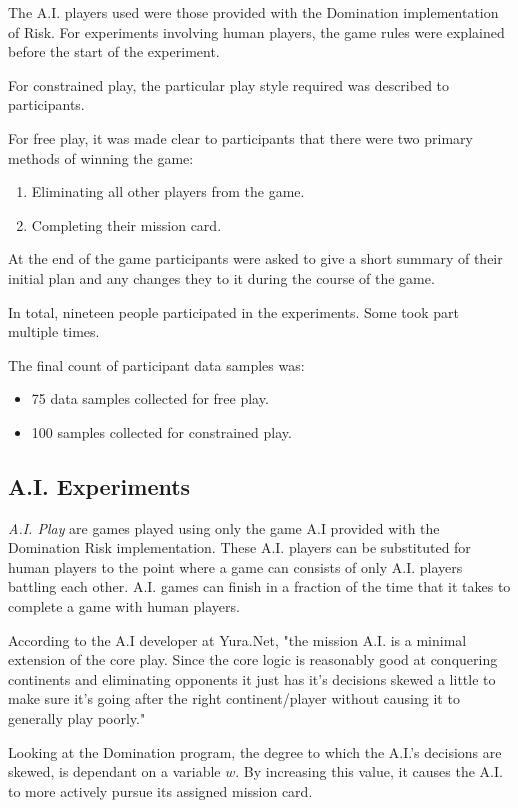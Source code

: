 \documentclass[parskip]{cs4rep}
\begin{document}
The A.I. players used were those provided with the Domination implementation of Risk. For experiments involving human players, the game rules were explained before the start of the experiment. 

For constrained play, the particular play style required was described to participants.

For free play, it was made clear to participants that there were two primary methods of winning the game:
\begin{enumerate}
\item
Eliminating all other players from the game.
\item
Completing their mission card.
\end{enumerate}

At the end of the game participants were asked to give a short summary of their initial plan and any changes they to it during the course of the game. 

In total, nineteen people participated in the experiments. Some took part multiple times.

The final count of participant data samples was:

\begin{itemize}
\item
75 data samples collected for free play.
\item
100 samples collected for constrained play.
\end{itemize}

\subsection{A.I. Experiments}

\textit{A.I. Play} are games played using only the game A.I provided with the Domination Risk implementation. These A.I. players can be substituted for human players to the point where a game can consists of only A.I. players battling each other. A.I. games can finish in a fraction of the time that it takes to complete a game with human players.

According to the A.I developer at Yura.Net, "the mission A.I. is a minimal extension of the core play. Since the core logic is reasonably good at conquering continents and eliminating opponents it just has it's decisions skewed a little to make sure it's going after the right continent/player without causing it to generally play poorly."

Looking at the Domination program, the degree to which the A.I.'s decisions are skewed, is dependant on a variable $w$. By increasing this value, it causes the A.I. to more actively pursue its assigned mission card.
\end{document}
